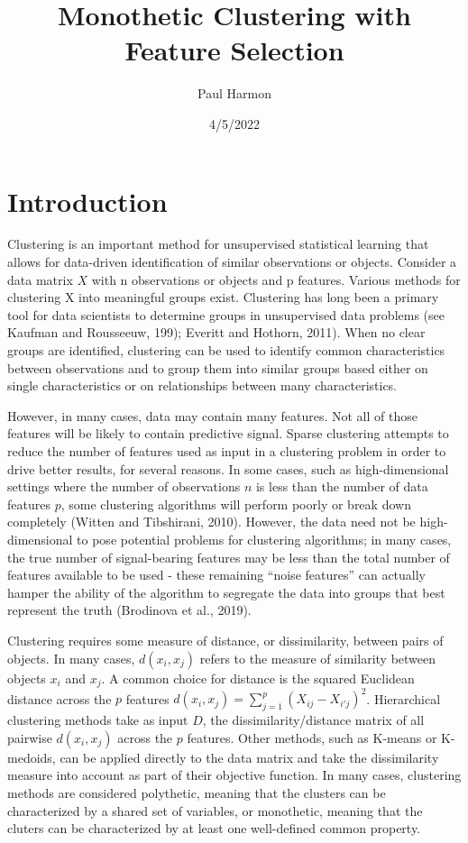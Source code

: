\documentclass[
]{article}
\title{Monothetic Clustering with Feature Selection}
\author{Paul Harmon}
\date{4/5/2022}
\begin{document}
\maketitle

\hypertarget{introduction}{%
\section{Introduction}\label{introduction}}

Clustering is an important method for unsupervised statistical learning
that allows for data-driven identification of similar observations or
objects. Consider a data matrix \(X\) with n observations or objects and
p features. Various methods for clustering X into meaningful groups
exist. Clustering has long been a primary tool for data scientists to
determine groups in unsupervised data problems (see Kaufman and
Rousseeuw, 199); Everitt and Hothorn, 2011). When no clear groups are
identified, clustering can be used to identify common characteristics
between observations and to group them into similar groups based either
on single characteristics or on relationships between many
characteristics.

However, in many cases, data may contain many features. Not all of those
features will be likely to contain predictive signal. Sparse clustering
attempts to reduce the number of features used as input in a clustering
problem in order to drive better results, for several reasons. In some
cases, such as high-dimensional settings where the number of
observations \(n\) is less than the number of data features \(p\), some
clustering algorithms will perform poorly or break down completely
(Witten and Tibshirani, 2010). However, the data need not be
high-dimensional to pose potential problems for clustering algorithms;
in many cases, the true number of signal-bearing features may be less
than the total number of features available to be used - these remaining
``noise features'' can actually hamper the ability of the algorithm to
segregate the data into groups that best represent the truth (Brodinova
et al., 2019).

Clustering requires some measure of distance, or dissimilarity, between
pairs of objects. In many cases, \(d(x_i,x_j)\) refers to the measure of
similarity between objects \(x_i\) and \(x_j\). A common choice for
distance is the squared Euclidean distance across the \(p\) features
\(d(x_i, x_j) = \sum_{j=1}^p (X_{ij} - X_{i'j})^2\). Hierarchical
clustering methods take as input \(D\), the dissimilarity/distance
matrix of all pairwise \(d(x_i,x_j)\) across the \(p\) features. Other
methods, such as K-means or K-medoids, can be applied directly to the
data matrix and take the dissimilarity measure into account as part of
their objective function. In many cases, clustering methods are
considered polythetic, meaning that the clusters can be characterized by
a shared set of variables, or monothetic, meaning that the cluters can
be characterized by at least one well-defined common property.
\end{document}
